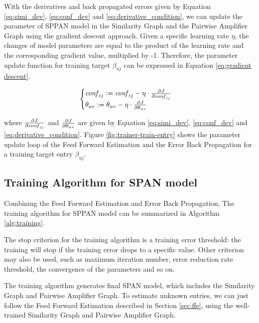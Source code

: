 With the derivatives and back propagated errors given by Equation
\ref{eq:simi_dev}, \ref{eq:conf_dev} and
\ref{eq:derivative_condition}, we can update the parameter of SPPAN
model in the Similarity Graph and the Pairwise Amplifier Graph using
the gradient descent approach. Given a specific learning rate $\eta$,
the changes of model parameters are equal to the product of the
learning rate and the corresponding gradient value, multiplied by
-1. Therefore, the parameter update function for training target
$\beta_{uj}$ can be expressed in Equation \ref{eq:gradient descent}.

\begin{equation}
  \label{eq:gradient descent}
  \begin{cases}
    \confi{ij} := \confi{ij}-\eta \cdot \pa{J}{\confi{ij}}\\
    \theta_{uv} := \theta_{uv} -\eta \cdot \pa{J}{\theta_{uv}}
  \end{cases}
\end{equation}

\noindent where $\frac{\partial {J}}{\partial {\mathit{conf}_{ij}}}$ and $\frac{\partial {J}}{\partial {\theta_{uv}}}$ are
given by Equation \ref{eq:simi_dev}, \ref{eq:conf_dev} and
\ref{eq:derivative_condition}. Figure \ref{fig:trainer-train-entry}
shows the parameter update loop of the Feed Forward Estimation and the
Error Back Propagation for a training target entry $\beta_{uj}$.

\subsection{Training Algorithm for SPAN model}
Combining the Feed Forward Estimation and Error Back Propagation, The
training algorithm for SPPAN model can be summarized in Algorithm
\ref{alg:training}.

The stop criterion for the training algorithm is a training error
threshold: the training will stop if the training error drops to a
specific value. Other criterion may also be used, such as maximum
iteration number\cite{?}, error reduction rate threshold\cite{?}, the
convergence of the parameters\cite{?} and so on.

The training algorithm generates final SPAN model, which includes the
Similarity Graph and Pairwise Amplifier Graph. To estimate unknown
entries, we can just follow the Feed Forward Estimation described in
Section \ref{sec:ffe}, using the well-trained Similarity Graph and
Pairwise Amplifier Graph.


